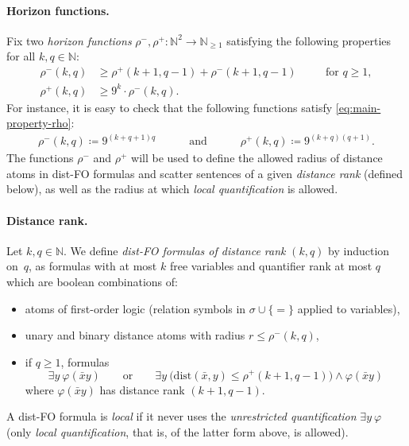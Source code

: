 \documentclass[11pt]{article}
\newcommand{\eqdef}{\coloneqq}
\theoremstyle{remark}
\newcommand{\from}{\colon}
\newcommand{\set}[1]{\{#1\}}
\def\phi{\varphi}
\def\N{\mathbb N}
\renewcommand{\le}{\leqslant}
\renewcommand{\ge}{\geqslant}
\newcommand{\dist}{\mathrm{dist}}
\newcommand{\distFO}{\textrm{\upshape dist-FO}\xspace}
\begin{document}
\paragraph{Horizon functions.}
Fix two \emph{horizon functions} $\rho^-,\rho^+\from \N^2\to \N_{\ge 1}$ satisfying the following properties for all $k,q\in\N$:
\begin{equation}\label{eq:main-property-rho}
\begin{aligned}
    \rho^-(k,q)&\ge \rho^+(k+1,q-1)+\rho^-(k+1,q-1)
    &&\quad\text{for $q\ge 1$},\\
    \rho^+(k,q)&\ge 9^k \cdot \rho^-(k,q).
\end{aligned}
\end{equation}
For instance, it is easy to check that the following
functions satisfy \eqref{eq:main-property-rho}:
\begin{align*}%
   \rho^-(k,q) \eqdef 9^{(k+q+1)q} \quad\quad\quad\text{and}\quad\quad\quad
   \rho^+(k,q) \eqdef 9^{(k+q)(q+1)}.
\end{align*}
The functions \(\rho^-\) and \(\rho^+\) will be used to define the allowed radius of distance atoms in \distFO formulas and scatter sentences of a given \emph{distance rank} (defined below), as well as the radius at which \emph{local quantification} is allowed.

\paragraph{Distance rank.}
Let \(k,q \in \N\).
We define \emph{\distFO formulas of distance rank} \((k,q)\) by induction on~$q$,
as formulas with at most $k$ free variables and
quantifier rank at most $q$ which are boolean combinations of:
\begin{itemize}
    \item atoms of first-order logic (relation symbols in $\sigma\cup\set{=}$ applied to variables),
    \item unary and binary distance atoms with radius  \(r\le \rho^-(k,q)\),
    \item if $q\ge 1$, formulas
        \[
            \exists y~\phi(\bar x y)
            \quad\quad\text{or}\quad\quad
            \exists y~\bigl(\dist(\bar x,y) \le \rho^+(k+1,q-1)\bigr) \land \phi(\bar x y)
        \]
        where \(\phi(\bar x y)\) has distance rank \((k+1,q-1)\).
\end{itemize}
A \distFO formula is \emph{local}
if it never uses the \emph{unrestricted quantification} $\exists y~\phi$
(only \emph{local quantification}, that is, of the latter form above, is allowed).
\end{document}
